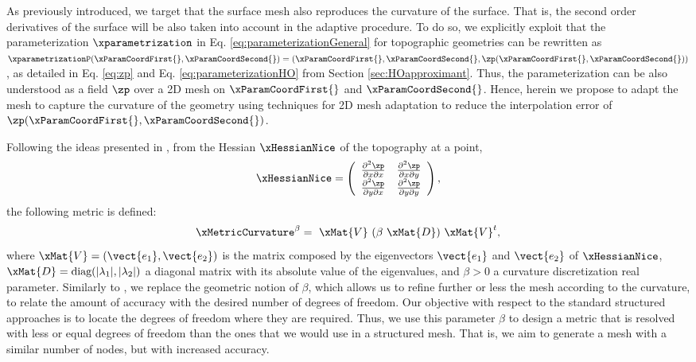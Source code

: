 \documentclass[1p]{elsarticle}
\begin{document}
As previously introduced,
we target that the surface mesh also reproduces the curvature of the surface. That is,  the second order derivatives of the surface will be also taken into account in the adaptive procedure. 
To do so, we explicitly exploit
that the parameterization $\xparametrization$ in Eq. \eqref{eq:parameterizationGeneral} for topographic geometries can be rewritten as $\xparametrizationP(\xParamCoordFirst{},\xParamCoordSecond{})=(\xParamCoordFirst{},\xParamCoordSecond{},\zp(\xParamCoordFirst{},\xParamCoordSecond{}))$, as detailed in Eq. \eqref{eq:zp} and Eq. \eqref{eq:parameterizationHO} from Section \ref{sec:HOapproximant}.
Thus, the parameterization can be also understood as a field $\zp$ over a 2D mesh on $\xParamCoordFirst{}$ and $\xParamCoordSecond{}$.
Hence, herein we propose to
adapt the mesh to capture the curvature of the geometry using techniques for 2D mesh adaptation to reduce the interpolation error of $\zp(\xParamCoordFirst{},\xParamCoordSecond{})$. 

Following the ideas presented in \cite{peraire:87,frey2005anisotropic}, from the Hessian $\xHessianNice$ of the topography at a point, 
\begin{equation*}
	\xHessianNice=\left(
	\begin{array}{cc}
		\frac{\partial^2 \zp}{\partial x\partial x}&\frac{\partial^2 \zp}{\partial x\partial y} \\
		\frac{\partial^2 \zp}{\partial y\partial x} & \frac{\partial^2 \zp}{\partial y\partial y}
	\end{array}
	\right),
\end{equation*}
the following  metric is defined:
\begin{equation}
\label{eq:metricCurvature}
\xMetricCurvature^\beta=\ \xMat{V}\ (\beta\ \xMat{D})\ \xMat{V}^t,
\end{equation}
where $\xMat{V}=(\vect{e_1},\vect{e_2})$ is the matrix composed by the eigenvectors $\vect{e_1}$ and $\vect{e_2}$ of $\xHessianNice$, $\xMat{D}= \text{diag}(|\lambda_1|,|\lambda_2|)$ a diagonal matrix with its absolute value of the eigenvalues, and $\beta>0$ a curvature discretization real parameter.
Similarly to \cite{loseille2009optimal,loseille2011continuous1,loseille2011continuous2},
we replace the geometric notion of $\beta$, which allows us to refine further or less the mesh according to the curvature, to relate the amount of accuracy with the desired number of degrees of freedom.
Our objective with respect to the standard structured approaches is to locate the degrees of freedom where they are required. Thus, we  use this parameter $\beta$ to design a metric that is resolved with less or equal degrees of freedom than the ones that we would use in a structured mesh.
That is, we aim to generate a mesh with a similar number of nodes, but with increased accuracy.
\end{document}
